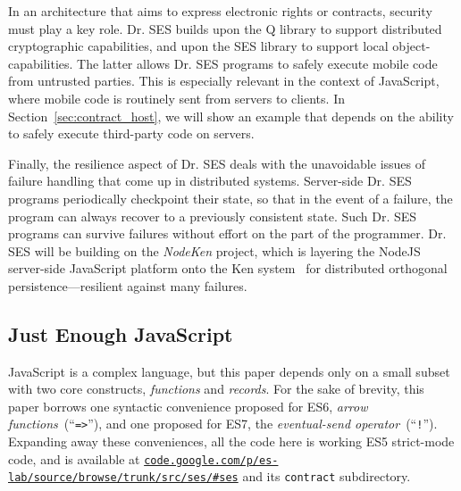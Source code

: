 \documentclass{llncs}
\newcommand{\myurl}[1]{{\href{http://#1}{\texttt{#1}}}}
\begin{document}
In an architecture that aims to express electronic rights or contracts, security must play a key role. Dr. SES builds upon the Q library to support distributed cryptographic capabilities, and upon the SES library to support local object-capabilities. The latter allows Dr. SES programs to safely execute mobile code from untrusted parties.
This is especially relevant in the context of JavaScript, where mobile code is routinely sent from servers to clients. In Section~\ref{sec:contract_host}, we will show an example that  depends on the ability to safely execute third-party code on servers.

Finally, the resilience aspect of Dr. SES deals with the unavoidable issues of failure handling that come up in distributed systems. 
Server-side Dr. SES programs periodically checkpoint their state, so that in the event of a failure, the program can always recover to a previously consistent state. Such Dr. SES programs can survive failures without effort on the part of the programmer. Dr. SES will be building on the \emph{NodeKen} project, which is layering the NodeJS server-side JavaScript platform onto the Ken system~\cite{Yoo:CKen} for distributed orthogonal persistence---resilient against many failures.





\subsection{Just Enough JavaScript}

JavaScript is a complex language, but this paper depends only on a small subset with two core constructs, \emph{functions} and \emph{records}. For the sake of brevity, this paper borrows one syntactic convenience proposed for ES6, \emph{arrow functions}~(``{\tt =>}''), and one proposed for ES7, the \emph{eventual-send operator}~(``{\tt !}'').
 Expanding away these conveniences, all the code here is working ES5 strict-mode code, and is available at \myurl{code.google.com/p/es-lab/source/browse/trunk/src/ses/\#ses} and its {\tt contract} subdirectory.
\end{document}
